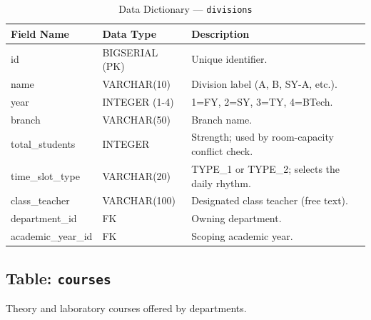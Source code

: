 \begin{table}[H]
    \centering
    \renewcommand{\arraystretch}{1.5}
    \begin{tabular}{|p{3.5cm}|p{2.5cm}|p{7.5cm}|}
        \hline
        \textbf{Field Name} & \textbf{Data Type} & \textbf{Description} \\
        \hline
        id & BIGSERIAL (PK) & Unique identifier. \\
        \hline
        name & VARCHAR(10) & Division label (A, B, SY-A, etc.). \\
        \hline
        year & INTEGER (1-4) & 1=FY, 2=SY, 3=TY, 4=BTech. \\
        \hline
        branch & VARCHAR(50) & Branch name. \\
        \hline
        total\_students & INTEGER & Strength; used by room-capacity conflict check. \\
        \hline
        time\_slot\_type & VARCHAR(20) & TYPE\_1 or TYPE\_2; selects the daily rhythm. \\
        \hline
        class\_teacher & VARCHAR(100) & Designated class teacher (free text). \\
        \hline
        department\_id & FK & Owning department. \\
        \hline
        academic\_year\_id & FK & Scoping academic year. \\
        \hline
    \end{tabular}
    \caption{Data Dictionary --- \texttt{divisions}}
    \label{tab:dd_divisions}
\end{table}

\subsection{Table: \texttt{courses}}
Theory and laboratory courses offered by departments.

